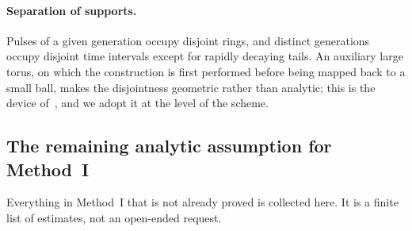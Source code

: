 \paragraph{Separation of supports.}
Pulses of a given generation occupy disjoint rings, and distinct generations occupy disjoint time intervals except for rapidly decaying tails. An auxiliary large torus, on which the construction is first performed before being mapped back to a small ball, makes the disjointness geometric rather than analytic; this is the device of~\cite{openai2026ns}, and we adopt it at the level of the scheme.

\subsection{The remaining analytic assumption for Method~I}

Everything in Method~I that is not already proved is collected here. It is a finite list of estimates, not an open-ended request.

